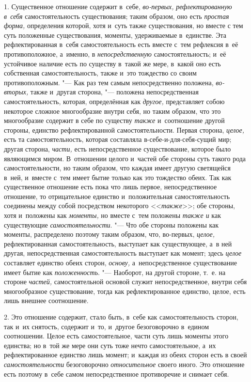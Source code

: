 1. Существенное отношение содержит в~себе, {\em во-первых,}
{\em рефлектированную в~себя} самостоятельность
существования; таким образом, оно есть {\em простая
форма,} определения которой, хотя и~суть также существования, но вместе с
тем суть положенные существования, моменты, удерживаемые в~единстве. Эта
рефлектированная в~себя самостоятельность есть вместе с~тем рефлексия в~её
противоположное, а~именно, в {\em непосредственную}
самостоятельность; и~её устойчивое наличие есть по существу в~такой же
мере, в~какой оно есть собственная самостоятельность, также и~это тождество
со своим противоположным. "--- Как раз тем самым непосредственно положена,
{\em во-вторых,} также и~другая сторона, "--- положена
непосредственная самостоятельность, которая, определённая как
{\em другое,} представляет собою некоторое сложное
многообразие внутри себя, но таким образом, что это многообразие содержит в
себе по существу {\em также} и~соотношение другой
стороны, единство рефлектированной самостоятельности. Первая сторона,
{\em целое,} есть та самостоятельность, которая
составляла в-себе-и-для-себя-сущий мир; другая сторона,
{\em части,} есть непосредственное существование,
которое было являющимся миром. В~отношении целого и~частей обе стороны суть
такого рода самостоятельности, но таким образом, что каждая имеет другую
светящейся в~ней, и~вместе с~тем имеет бытие только как это тождество
обеих. Так как существенное отношение есть пока что лишь первое,
непосредственное отношение, то отрицательное единство и~положительная
самостоятельность соединены между собой посредством некоторого
<<{\em также}>>; обе стороны, хотя и~положены как
{\em моменты,} но вместе с~тем положены {\em также и} как существующие
{\em самостоятельности}. "--- Что обе стороны положены как
моменты, распределено поэтому таким образом, что, во-первых,
{\em целое,} рефлектированная самостоятельность,
выступает как существующее, а~в ней другая, непосредственная
самостоятельность выступает как момент; здесь
{\em целое} составляет единство обеих сторон,
{\em основу,} а~непосредственное существование имеет
бытие как {\em положенность}. "--- Наоборот, на другой
стороне, т.~е. на стороне {\em частей,} самостоятельной
основой служит непосредственное, внутри себя многообразное существование,
тогда как рефлектированное единство, целое, есть лишь внешнее соотношение.

2. Это отношение содержит, стало быть, в~себе как самостоятельность сторон,
так и~их снятость, содержит и~то, и~другое безоговорочно в~едином
соотношении. Целое есть самостоятельное, части суть лишь моменты этого
единства; но в~той же мере они суть тоже нечто самостоятельное, а~их
рефлектированное единство лишь момент; и~каждая из обеих сторон есть в
своей {\em самостоятельности} безоговорочно {\em относительное} своего
иного.
Это отношение есть поэтому в~себе самом непосредственное противоречие и
снимает себя.

